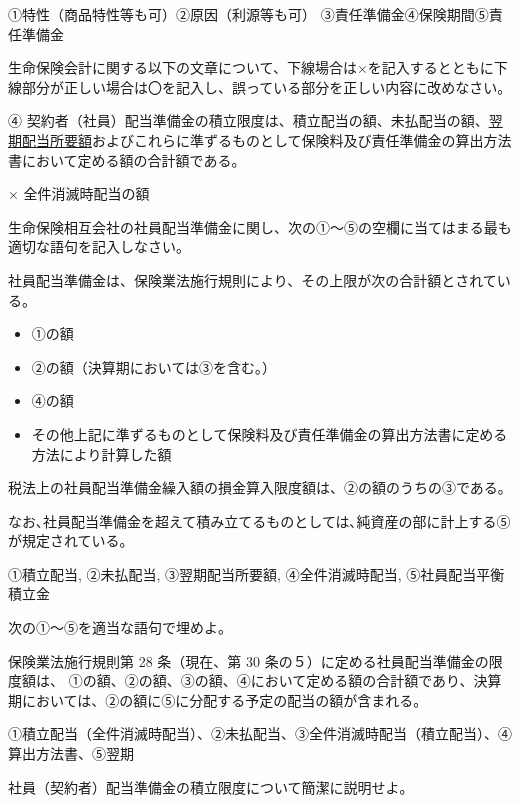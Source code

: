 \documentclass[report,gutter=10mm,fore-edge=10mm,uplatex,dvipdfmx]{jlreq}
\begin{document}

①特性（商品特性等も可）②原因（利源等も可）
③責任準備金④保険期間⑤責任準備金


生命保険会計に関する以下の文章について、下線場合は×を記入するとともに下線部分が正しい場合は〇を記入し、誤っている部分を正しい内容に改めなさい。

④
契約者（社員）配当準備金の積立限度は、積立配当の額、未払配当の額、\underline{翌期配当所要額}およびこれらに準ずるものとして保険料及び責任準備金の算出方法書において定める額の合計額である。


× 全件消滅時配当の額


生命保険相互会社の社員配当準備金に関し、次の①～⑤の空欄に当てはまる最も適切な語句を記入しなさい。

社員配当準備金は、保険業法施行規則により、その上限が次の合計額とされている。
\begin{itemize}
 \item ①の額 
 \item ②の額（決算期においては③を含む｡） 
 \item ④の額
 \item その他上記に準ずるものとして保険料及び責任準備金の算出方法書に定める方法により計算した額
\end{itemize}

税法上の社員配当準備金繰入額の損金算入限度額は、②の額のうちの③である。

なお､社員配当準備金を超えて積み立てるものとしては､純資産の部に計上する⑤が規定されている。


①積立配当, ②未払配当, ③翌期配当所要額, ④全件消滅時配当,
⑤社員配当平衡積立金



次の①～⑤を適当な語句で埋めよ。

保険業法施行規則第 28 条（現在、第 30
条の５）に定める社員配当準備金の限度額は、
①の額、②の額、③の額、④において定める額の合計額であり、決算期においては、②の額に⑤に分配する予定の配当の額が含まれる。


①積立配当（全件消滅時配当）、②未払配当、③全件消滅時配当（積立配当）、④算出方法書、⑤翌期



社員（契約者）配当準備金の積立限度について簡潔に説明せよ。
\end{document}
